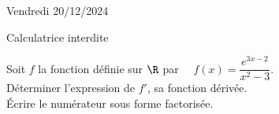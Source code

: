 \documentclass[a4paper,11pt,eval]{nsi}
\begin{document}
\textcolor{UGLiBlue}{Vendredi 20/12/2024}\\
\maketitle
\begin{center}
	Calculatrice interdite
\end{center}


Soit $f$ la fonction définie sur $\R$ par $\quad f(x)=\dfrac{e^{3x-2}}{x^2-3}$.\\[.5em]
Déterminer l'expression de $f'$, sa fonction dérivée.\\ 
Écrire le numérateur sous forme factorisée.\\

\\
\end{document}
